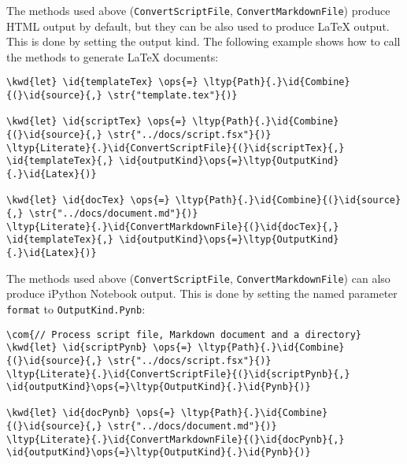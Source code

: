 \documentclass{article}
\newcommand{\id}[1]{\textcolor{black}{#1}}
\newcommand{\com}[1]{\textcolor{officegreen}{#1}}
\newcommand{\kwd}[1]{\textcolor{navy}{#1}}
\newcommand{\ops}[1]{\textcolor{purple}{#1}}
\newcommand{\str}[1]{\textcolor{olive}{#1}}
\begin{document}
The methods used above (\texttt{ConvertScriptFile}, \texttt{ConvertMarkdownFile})
produce HTML output by default, but they can be also used to produce LaTeX output. This is done
by setting the output kind. The following
example shows how to call the methods to generate LaTeX documents:
\begin{Verbatim}[commandchars=\\\{\}]
\kwd{let} \id{templateTex} \ops{=} \ltyp{Path}{.}\id{Combine}{(}\id{source}{,} \str{"template.tex"}{)}

\kwd{let} \id{scriptTex} \ops{=} \ltyp{Path}{.}\id{Combine}{(}\id{source}{,} \str{"../docs/script.fsx"}{)}
\ltyp{Literate}{.}\id{ConvertScriptFile}{(}\id{scriptTex}{,} \id{templateTex}{,} \id{outputKind}\ops{=}\ltyp{OutputKind}{.}\id{Latex}{)}

\kwd{let} \id{docTex} \ops{=} \ltyp{Path}{.}\id{Combine}{(}\id{source}{,} \str{"../docs/document.md"}{)}
\ltyp{Literate}{.}\id{ConvertMarkdownFile}{(}\id{docTex}{,} \id{templateTex}{,} \id{outputKind}\ops{=}\ltyp{OutputKind}{.}\id{Latex}{)}
\end{Verbatim}



The methods used above (\texttt{ConvertScriptFile}, \texttt{ConvertMarkdownFile})
can also produce iPython Notebook output. This is done
by setting the named parameter \texttt{format} to \texttt{OutputKind.Pynb}:
\begin{Verbatim}[commandchars=\\\{\}]
\com{// Process script file, Markdown document and a directory}
\kwd{let} \id{scriptPynb} \ops{=} \ltyp{Path}{.}\id{Combine}{(}\id{source}{,} \str{"../docs/script.fsx"}{)}
\ltyp{Literate}{.}\id{ConvertScriptFile}{(}\id{scriptPynb}{,} \id{outputKind}\ops{=}\ltyp{OutputKind}{.}\id{Pynb}{)}

\kwd{let} \id{docPynb} \ops{=} \ltyp{Path}{.}\id{Combine}{(}\id{source}{,} \str{"../docs/document.md"}{)}
\ltyp{Literate}{.}\id{ConvertMarkdownFile}{(}\id{docPynb}{,} \id{outputKind}\ops{=}\ltyp{OutputKind}{.}\id{Pynb}{)}
\end{Verbatim}
\end{document}
